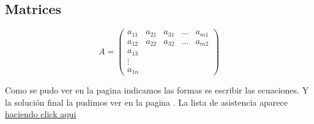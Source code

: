 \subsection*{Matrices}
$$A=\begin{pmatrix}
a_{11} & a_{21} & a_{31} & \hdots & a_{m1} \\
a_{12} & a_{22} & a_{32} & \hdots & a_{m2} \\
a_{13} \\
\vdots \\
a_{1n}
\end{pmatrix}$$

Como se pudo ver en la pagina \pageref{formulas} indicamos las formas es escribir las ecuaciones. Y la solución final la pudimos ver en la pagina \pageref{Atmos}. La lista de asistencia aparece \href{https://forms.gle/84VyN2QJq7twTHH87}{haciendo click aqui}
